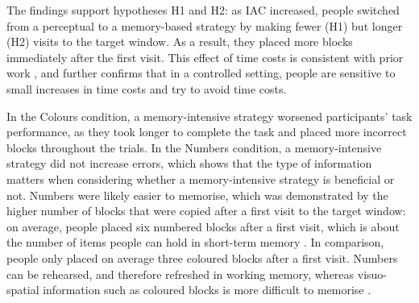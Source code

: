 

The findings support hypotheses H1 and H2: as IAC increased, people switched from a perceptual to a memory-based strategy by making fewer (H1) but longer (H2) visits to the target window. As a result, they placed more blocks immediately after the first visit. This effect of time costs is consistent with prior work \citep{Gray2006, Morgan2009, Waldron2007}, and further confirms that in a controlled setting, people are sensitive to small increases in time costs and try to avoid time costs.


In the Colours condition, a memory-intensive strategy worsened participants' task performance, as they took longer to complete the task and placed more incorrect blocks throughout the trials. In the Numbers condition, a memory-intensive strategy did not increase errors, which shows that the type of information matters when considering whether a memory-intensive strategy is beneficial or not. Numbers were likely easier to memorise, which was demonstrated by the higher number of blocks that were copied after a first visit to the target window: on average, people placed six numbered blocks after a first visit, which is about the number of items people can hold in short-term memory \citep{Miller1956}. In comparison, people only placed on average three coloured blocks after a first visit. Numbers can be rehearsed, and therefore refreshed in working memory, whereas visuo-spatial information such as coloured blocks is more difficult to memorise \citep{Baddeley1974}. 

